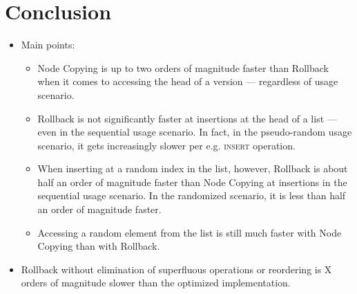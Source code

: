 \chapter{Conclusion}

\begin{itemize}

  \item Main points:

  \begin{itemize}

    \item Node Copying is up to two orders of magnitude faster than Rollback
    when it comes to accessing the head of a version --- regardless of usage
    scenario.

    \item Rollback is not significantly faster at insertions at the head of a
    list --- even in the sequential usage scenario. In fact, in the
    pseudo-random usage scenario, it gets increasingly slower per e.g.
    \textsc{insert} operation.

    \item When inserting at a random index in the list, however, Rollback is
    about half an order of magnitude faster than Node Copying at insertions in
    the sequential usage scenario. In the randomized scenario, it is less than
    half an order of magnitude faster.

    \item Accessing a random element from the list is still much faster with
    Node Copying than with Rollback.

  \end{itemize}

  \item Rollback without elimination of superfluous operations or reordering is
  X orders of magnitude slower than the optimized implementation. 

\end{itemize}


